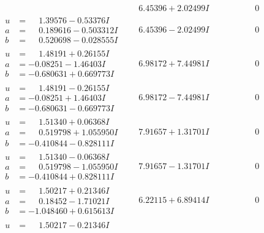 \documentclass[1p]{elsarticle_modified}
\theoremstyle{definition}
\begin{document}
$$\begin{array}{c|c|c}
 & \phantom{-}6.45396 + 2.02499 I & \phantom{-0.000000 } 0 \\ \hline\begin{aligned}
u &= \phantom{-}1.39576 - 0.53376 I \\
a &= \phantom{-}0.189616 - 0.503312 I \\
b &= \phantom{-}0.520698 - 0.028555 I\end{aligned}
 & \phantom{-}6.45396 - 2.02499 I & \phantom{-0.000000 } 0 \\ \hline\begin{aligned}
u &= \phantom{-}1.48191 + 0.26155 I \\
a &= -0.08251 - 1.46403 I \\
b &= -0.680631 + 0.669773 I\end{aligned}
 & \phantom{-}6.98172 + 7.44981 I & \phantom{-0.000000 } 0 \\ \hline\begin{aligned}
u &= \phantom{-}1.48191 - 0.26155 I \\
a &= -0.08251 + 1.46403 I \\
b &= -0.680631 - 0.669773 I\end{aligned}
 & \phantom{-}6.98172 - 7.44981 I & \phantom{-0.000000 } 0 \\ \hline\begin{aligned}
u &= \phantom{-}1.51340 + 0.06368 I \\
a &= \phantom{-}0.519798 + 1.055950 I \\
b &= -0.410844 - 0.828111 I\end{aligned}
 & \phantom{-}7.91657 + 1.31701 I & \phantom{-0.000000 } 0 \\ \hline\begin{aligned}
u &= \phantom{-}1.51340 - 0.06368 I \\
a &= \phantom{-}0.519798 - 1.055950 I \\
b &= -0.410844 + 0.828111 I\end{aligned}
 & \phantom{-}7.91657 - 1.31701 I & \phantom{-0.000000 } 0 \\ \hline\begin{aligned}
u &= \phantom{-}1.50217 + 0.21346 I \\
a &= \phantom{-}0.18452 - 1.71021 I \\
b &= -1.048460 + 0.615613 I\end{aligned}
 & \phantom{-}6.22115 + 6.89414 I & \phantom{-0.000000 } 0 \\ \hline\begin{aligned}
u &= \phantom{-}1.50217 - 0.21346 I \\

\end{aligned}
\end{array}$$
\end{document}
